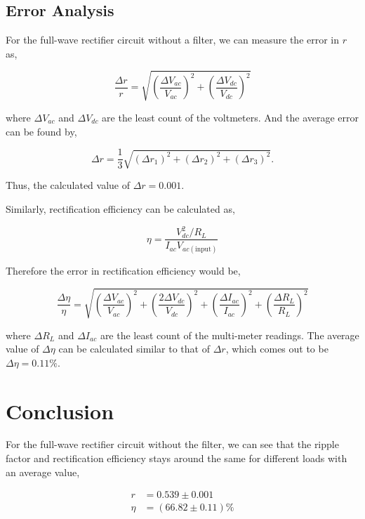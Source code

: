 \subsection{Error Analysis}
For the full-wave rectifier circuit without a filter, we can measure the error in $r$ as,

\begin{equation*}
    \frac{\Delta r}{r} = \sqrt{\left(\frac{\Delta V_{ac}}{V_{ac}}\right)^2 + \left(\frac{\Delta V_{dc}}{V_{dc}}\right)^2}
\end{equation*}

where $\Delta V_{ac}$ and $\Delta V_{dc}$ are the least count of the voltmeters. And the average error can be found by,

\begin{equation*}
    \Delta r = \frac{1}{3}\sqrt{(\Delta r_1)^2 + (\Delta r_2)^2 + (\Delta r_3)^2}.
\end{equation*}

Thus, the calculated value of $\Delta r = 0.001$. 

Similarly, rectification efficiency can be calculated as,

\begin{equation*}
    \eta = \frac{V_{dc}^2/R_L}{I_{ac}V_{ac(\text{input})}}
\end{equation*}

Therefore the error in rectification efficiency would be,

\begin{equation*}
    \frac{\Delta \eta}{\eta} = \sqrt{\left(\frac{\Delta V_{ac}}{V_{ac}}\right)^2 + \left(\frac{2\Delta V_{dc}}{V_{dc}}\right)^2 + \left(\frac{\Delta I_{ac}}{I_{ac}}\right)^2 + \left(\frac{\Delta R_{L}}{R_{L}}\right)^2}
\end{equation*}

where $\Delta R_L$ and $\Delta I_{ac}$ are the least count of the multi-meter readings. The average value of $\Delta \eta$ can be calculated similar to that of $\Delta r$, which comes out to be $\Delta \eta = 0.11\%$. 

\section{Conclusion}
For the full-wave rectifier circuit without the filter, we can see that the ripple factor and rectification efficiency stays around the same for different loads with an average value,

\begin{align*}
    r &= 0.539 \pm 0.001\\
    \eta &= (66.82 \pm 0.11)\%
\end{align*}

